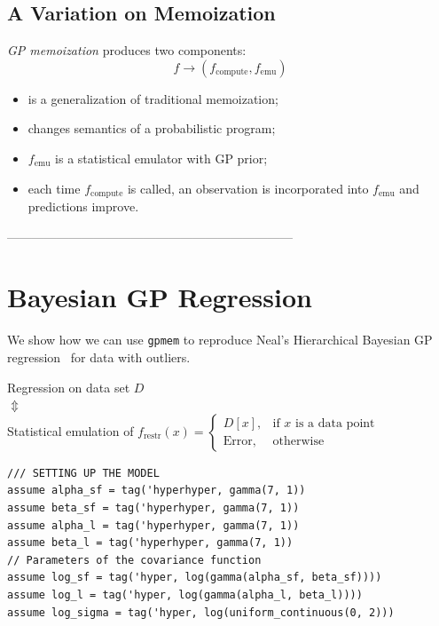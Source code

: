 \documentclass[a0,portrait]{a0poster}
\newcommand{\compute}{{\textrm{compute}}}
\newcommand{\emu}{{\textrm{emu}}}
\newcommand{\restr}{{\textrm{restr}}}
\begin{document}
\begin{multicols}{3}
\subsection*{A Variation on Memoization}
{\em GP memoization} produces two components:
\[ f \to (f_\compute, f_\emu) \]
\begin{itemize}
\setlength{\itemindent}{1cm}
 \item is a generalization of traditional memoization;
 \item changes semantics of a probabilistic program;
 \item $f_\emu$ is a statistical emulator with GP prior;
 \item each time $f_\compute$ is called, an observation is incorporated into $f_\emu$ and predictions improve.
\end{itemize}


---------------------------------------------------------------------


\section*{Bayesian GP Regression}

We show how we can use  {\tt gpmem} to reproduce Neal's Hierarchical Bayesian GP regression~\cite{neal1997monte} for data with outliers.

\begin{center}
Regression on data set $D$ \\
$\Updownarrow$ \\
Statistical emulation of $f_\restr(x) = \begin{cases}
      D[x], & \text{if $x$ is a data point} \\
      \text{Error}, & \text{otherwise}
    \end{cases}$
\end{center}
\vspace{1cm}
\begin{minipage}{\linewidth}
\belowcaptionskip=-10pt
\begin{lstlisting}[frame=single,mathescape,label=alg:gphierarch,basicstyle=\fontsize{20}{22}\selectfont\ttfamily]
/// SETTING UP THE MODEL
assume alpha_sf = tag('hyperhyper, gamma(7, 1))
assume beta_sf = tag('hyperhyper, gamma(7, 1))
assume alpha_l = tag('hyperhyper, gamma(7, 1))
assume beta_l = tag('hyperhyper, gamma(7, 1))
// Parameters of the covariance function
assume log_sf = tag('hyper, log(gamma(alpha_sf, beta_sf))))
assume log_l = tag('hyper, log(gamma(alpha_l, beta_l))))
assume log_sigma = tag('hyper, log(uniform_continuous(0, 2)))


\end{lstlisting}
\end{minipage}
\end{multicols}
\end{document}
